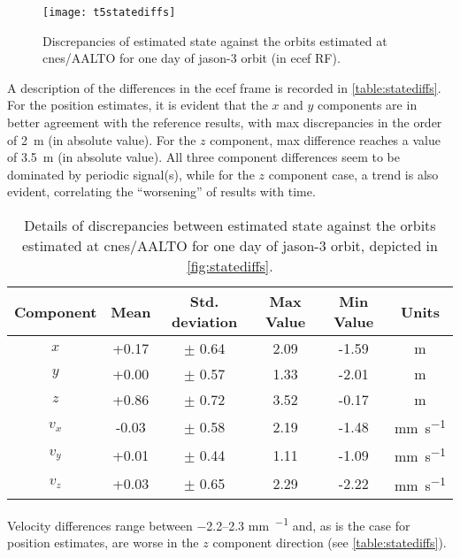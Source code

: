 \begin{figure}[h]
    \centering
    \texttt{[image: t5statediffs]}
    \caption{Discrepancies of estimated state against the orbits estimated at \gls{cnes}/AALTO for one day of \gls{jason}-3 orbit (in \gls{ecef} RF).}
    \label{fig:statediffs}
\end{figure}

A description of the differences in the \gls{ecef} frame is recorded in 
\autoref{table:statediffs}. For the position estimates, it is evident that the $x$ 
and $y$ components are in better 
agreement with the reference results, with max discrepancies in the order of 
\SI{2}{\metre} (in absolute value). For the $z$ component, max difference reaches 
a value of \SI{3.5}{\metre} (in absolute value). All three component differences 
seem to be dominated by periodic signal(s), while for the $z$ component case, 
a trend is also evident, correlating the ``worsening'' of results with time.

\begin{table}[h!]
    \centering
    \begin{tabularx}{\textwidth}{cccccc}
        \toprule
        \textbf{Component} & \textbf{Mean} & \textbf{Std. deviation} & \textbf{Max Value} & \textbf{Min Value} & \textbf{Units}\\
        \hline
        $x$   &  +0.17 & $\pm$ 0.64 & 2.09 & -1.59 & \si{\metre}\\
        $y$   &  +0.00 & $\pm$ 0.57 & 1.33 & -2.01 & \si{\metre}\\
        $z$   &  +0.86 & $\pm$ 0.72 & 3.52 & -0.17 & \si{\metre}\\
        $v_x$ &  -0.03 & $\pm$ 0.58 & 2.19 & -1.48 & \si{\milli\metre\per\second}\\
        $v_y$ &  +0.01 & $\pm$ 0.44 & 1.11 & -1.09 & \si{\milli\metre\per\second}\\
        $v_z$ &  +0.03 & $\pm$ 0.65 & 2.29 & -2.22 & \si{\milli\metre\per\second}\\
       \bottomrule
    \end{tabularx}
    \caption{Details of discrepancies between estimated state against the orbits estimated at \gls{cnes}/AALTO for one day of \gls{jason}-3 orbit, depicted in \autoref{fig:statediffs}.}
    \label{table:statediffs}
\end{table}

Velocity differences range between \numrange{-2.2}{2.3} \si{\milli\metre\per\sec} and, as is the 
case for position estimates, are worse in the $z$ component direction (see 
\autoref{table:statediffs}).

